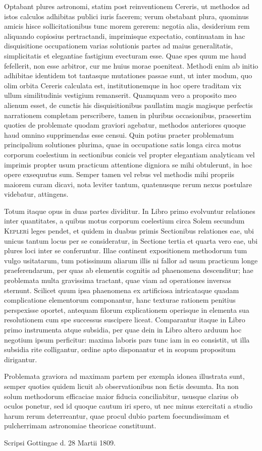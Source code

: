 Optabant plures astronomi, statim post reinventionem Cereris, ut methodos ad istos calculos adhibitas publici iuris facerem; verum obstabant plura, quominus amicis hisce sollicitationibus tunc morem gererem: negotia alia, desiderium rem aliquando copiosius pertractandi, imprimisque expectatio, continuatam in hac disquisitione occupationem varias solutionis partes ad maius generalitatis, simplicitatis et elegantiae fastigium evecturam esse. Quae spes quum me haud fefellerit, non esse arbitror, cur me huius morae poeniteat. Methodi enim ab initio adhibitae identidem tot tantasque mutationes passae sunt, ut inter modum, quo olim orbita Cereris calculata est, institutionemque
in hoc opere traditam vix ullum similitudinis vestigium remanserit. Quamquam vero a proposito meo alienum esset, de cunctis his disquisitionibus paullatim magis magisque perfectis narrationem completam perscribere, tamen in pluribus occasionibus, praesertim quoties de problemate quodam graviori agebatur, methodos anteriores quoque haud omnino supprimendas esse censui. Quin potius praeter problematum principalium solutiones plurima, quae in occupatione satis longa circa motus corporum coelestium in sectionibus conicis vel propter elegantiam analyticam vel imprimis propter usum practicum attentione digniora se mihi obtulerunt, in hoc opere exsequutus sum. Semper tamen vel rebus vel methodis mihi propriis maiorem curam dicavi, nota leviter tantum, quatenusque rerum nexus postulare videbatur, attingens.

Totum itaque opus in duas partes dividitur. In Libro primo evolvuntur relationes inter quantitates, a quibus motus corporum coelestium circa Solem secundum \textsc{Kepler}i leges pendet, et quidem in duabus primis Sectionibus relationes eae, ubi unicus tantum locus per se consideratur, in Sectione tertia et quarta vero eae, ubi plures loci inter se conferuntur. Illae continent expositionem methodorum tum vulgo usitatarum, tum potissimum aliarum illis ni fallor ad usum practicum longe praeferendarum, per quas ab elementis cognitis ad phaenomena descenditur; hae problemata multa gravissima tractant, quae viam ad operationes inversas sternunt. Scilicet quum ipsa phaenomena ex artificiosa intricataque quadam complicatione elementorum componantur, hanc texturae rationem penitius perspexisse oportet, antequam filorum explicationem operisque in elementa sua resolutionem cum spe successus suscipere liceat. Comparantur itaque in Libro primo instrumenta atque subsidia, per quae dein in Libro altero arduum hoc negotium ipsum perficitur: maxima laboris pars tunc iam in eo consistit, ut illa subsidia rite colligantur, ordine apto disponantur et in scopum propositum dirigantur.

Problemata graviora ad maximam partem per exempla idonea illustrata
sunt, semper quoties quidem licuit ab observationibus non fictis desumta. Ita non solum methodorum efficaciae maior fiducia conciliabitur, ususque clarius ob oculos ponetur, sed id quoque cautum iri spero, ut nec minus exercitati a studio harum rerum deterreantur, quae procul dubio partem foecundissimam et pulcherrimam astronomiae theoricae constituunt.

Scripsi Gottingae d. 28 Martii 1809.
